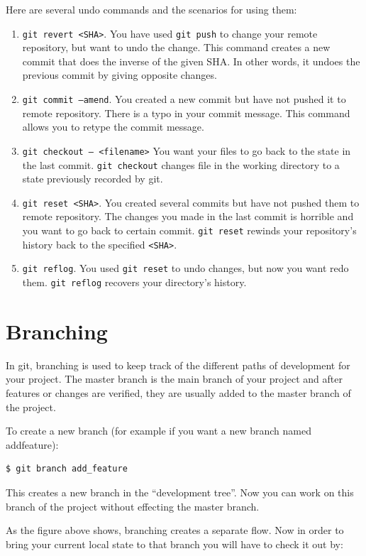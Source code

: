 \documentclass[12pt]{report}
\renewcommand\section[1]{{\chapter{#1}}}
\begin{document}
Here are several undo commands and the scenarios for using them:

\begin{enumerate}
  \item \texttt{git revert <SHA>}. You have used \texttt{git push} to change your remote repository, but want to undo the change. This command creates a new commit that does the inverse of the given SHA. In other words, it undoes the previous commit by giving opposite changes.
  \item \texttt{git commit --amend}. You created a new commit but have not pushed it to remote repository. There is a typo in your commit message. This command allows you to retype the commit message.
  \item \texttt{git checkout -- <filename>} You want your files to go back to the state in the last commit. \texttt{git checkout} changes file in the working directory to a state previously recorded by git.
  \item \texttt{git reset <SHA>}. You created several commits but have not pushed them to remote repository. The changes you made in the last commit is horrible and you want to go back to certain commit. \texttt{git reset} rewinds your repository's history back to the specified \texttt{<SHA>}.
  \item \texttt{git reflog}. You used \texttt{git reset} to undo changes, but now you want redo them. \texttt{git reflog} recovers your directory's history.
\end{enumerate}

\section{Branching}

In git, branching is used to keep track of the different paths of development for your project.  The master branch is the main branch of your project and after features or changes are verified, they are usually added to the master branch of the project.

To create a new branch (for example if you want a new branch named addfeature):
\begin{verbatim}
$ git branch add_feature
\end{verbatim}
  
This creates a new branch in the “development tree”.  Now you can work on this branch of the project without effecting the master branch.


As the figure above shows, branching creates a separate flow.  Now in order to bring your current local state to that branch you will have to check it out by:
\end{document}
